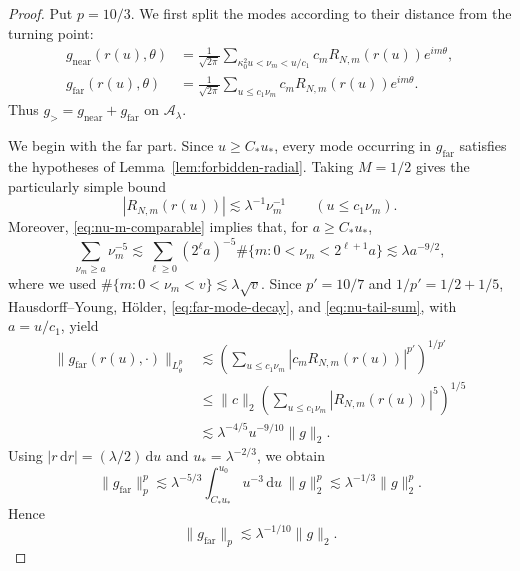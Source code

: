 \documentclass[11pt,a4paper]{amsart}
\numberwithin{equation}{section}
\newcommand{\dd}{\,\mathrm d}
\newcommand{\norm}[1]{\lVert #1\rVert}
\begin{document}
\begin{proof}
Put \(p=10/3\). We first split the modes according to their distance from the
turning point:
\[
 \begin{aligned}
 g_{\mathrm{near}}(r(u),\theta)
 &=\frac1{\sqrt{2\pi}}
   \sum_{\kappa_0^2u<\nu_m<u/c_1}
   c_mR_{N,m}(r(u))e^{im\theta},\\
 g_{\mathrm{far}}(r(u),\theta)
 &=\frac1{\sqrt{2\pi}}
   \sum_{u\le c_1\nu_m}
   c_mR_{N,m}(r(u))e^{im\theta}.
 \end{aligned}
\]
Thus \(g_>=g_{\mathrm{near}}+g_{\mathrm{far}}\) on
\(\mathcal A_\lambda\).

We begin with the far part. Since \(u\ge C_*u_*\), every mode occurring in
\(g_{\mathrm{far}}\) satisfies the hypotheses of
Lemma~\ref{lem:forbidden-radial}. Taking \(M=1/2\) gives the particularly
simple bound
\begin{equation}\label{eq:far-mode-decay}
 |R_{N,m}(r(u))|\lesssim\lambda^{-1}\nu_m^{-1}
 \qquad (u\le c_1\nu_m).
\end{equation}
Moreover, \eqref{eq:nu-m-comparable} implies that, for
\(a\ge C_*u_*\),
\begin{equation}\label{eq:nu-tail-sum}
 \sum_{\nu_m\ge a}\nu_m^{-5}
 \lesssim
 \sum_{\ell\ge0}(2^\ell a)^{-5}
 \#\{m:0<\nu_m<2^{\ell+1}a\}
 \lesssim\lambda a^{-9/2},
\end{equation}
where we used \(\#\{m:0<\nu_m<v\}\lesssim\lambda\sqrt v\).
Since \(p'=10/7\) and \(1/p'=1/2+1/5\), Hausdorff--Young, H\"older,
\eqref{eq:far-mode-decay}, and \eqref{eq:nu-tail-sum}, with
\(a=u/c_1\), yield
\[
 \begin{aligned}
 \norm{g_{\mathrm{far}}(r(u),\cdot)}_{L_\theta^p}
 &\lesssim
 \left(\sum_{u\le c_1\nu_m}|c_mR_{N,m}(r(u))|^{p'}\right)^{1/p'}\\
 &\le \norm c_2
 \left(\sum_{u\le c_1\nu_m}|R_{N,m}(r(u))|^5\right)^{1/5}\\
 &\lesssim\lambda^{-4/5}u^{-9/10}\norm g_2.
 \end{aligned}
\]
Using \(|r\dd r|=(\lambda/2)\dd u\) and \(u_*=\lambda^{-2/3}\), we obtain
\[
 \norm{g_{\mathrm{far}}}_p^p
 \lesssim
 \lambda^{-5/3}\int_{C_*u_*}^{u_0}u^{-3}\dd u\,\norm g_2^p
 \lesssim\lambda^{-1/3}\norm g_2^p.
\]
Hence
\begin{equation}\label{eq:far-component-bound}
 \norm{g_{\mathrm{far}}}_p
 \lesssim\lambda^{-1/10}\norm g_2.
\end{equation}


\end{proof}
\end{document}
